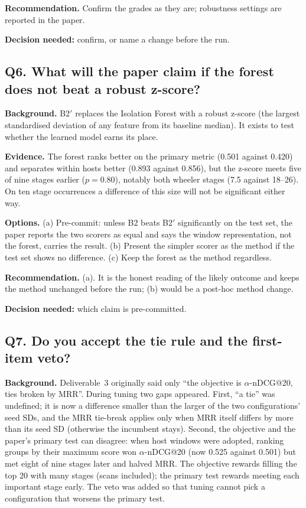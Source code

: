 \documentclass[10.5pt,a4paper]{article}
\newcommand{\rec}[1]{\par\smallskip\noindent\colorbox{gray!12}{\parbox{\dimexpr\linewidth-2\fboxsep}{\textbf{Recommendation.} #1}}\par\smallskip}
\newcommand{\ask}[1]{\par\noindent\textbf{Decision needed:} #1\par\medskip}
\newcommand{\sub}[1]{\par\smallskip\noindent\textbf{#1}\quad}
\begin{document}
\rec{Confirm the grades as they are; robustness settings are reported in the paper.}
\ask{confirm, or name a change before the run.}

\subsection*{Q6. What will the paper claim if the forest does not beat a robust z-score?}

\sub{Background.} B2$'$ replaces the Isolation Forest with a robust z-score (the largest standardised deviation of any feature from its baseline median). It exists to test whether the learned model earns its place.

\sub{Evidence.} The forest ranks better on the primary metric (0.501 against 0.420) and separates within hosts better (0.893 against 0.856), but the z-score meets five of nine stages earlier ($p = 0.80$), notably both wheeler stages (7.5 against 18--26). On ten stage occurrences a difference of this size will not be significant either way.

\sub{Options.} (a) Pre-commit: unless B2 beats B2$'$ significantly on the test set, the paper reports the two scorers as equal and says the window representation, not the forest, carries the result. (b) Present the simpler scorer as the method if the test set shows no difference. (c) Keep the forest as the method regardless.

\rec{(a). It is the honest reading of the likely outcome and keeps the method unchanged before the run; (b) would be a post-hoc method change.}
\ask{which claim is pre-committed.}

\subsection*{Q7. Do you accept the tie rule and the first-item veto?}

\sub{Background.} Deliverable~3 originally said only ``the objective is $\alpha$-nDCG@20, ties broken by MRR''. During tuning two gaps appeared. First, ``a tie'' was undefined; it is now a difference smaller than the larger of the two configurations' seed SDs, and the MRR tie-break applies only when MRR itself differs by more than its seed SD (otherwise the incumbent stays). Second, the objective and the paper's primary test can disagree: when host windows were adopted, ranking groups by their maximum score won $\alpha$-nDCG@20 (now 0.525 against 0.501) but met eight of nine stages later and halved MRR. The objective rewards filling the top 20 with many stages (scans included); the primary test rewards meeting each important stage early. The veto was added so that tuning cannot pick a configuration that worsens the primary test.
\end{document}

